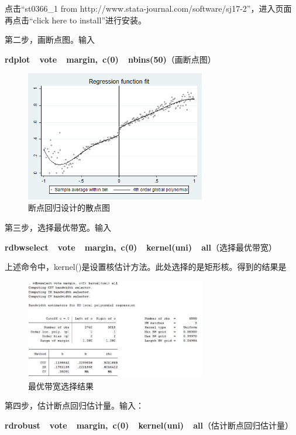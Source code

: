 \documentclass[cn,10pt,math=newtx,citestyle=gb7714-2015,bibstyle=gb7714-2015]{elegantbook}
\begin{document}
	点击“st0366\_1 from http://www.stata-journal.com/software/sj17-2”，进入页面再点击“click here to install”进行安装。
	
	第二步，画断点图。输入
	
	\textbf{rdplot~~vote~~margin,~c(0)~~nbins(50)}（画断点图）
	
	\begin{figure}[htbp]
		\centering
		\includegraphics[width=0.7\textwidth]{rdgraph.png}
		\caption{断点回归设计的散点图}\label{fig:digit}
	\end{figure}
	
	第三步，选择最优带宽。输入
	
	\textbf{rdbwselect~~vote~~margin,~c(0)~~kernel(uni)~~all}（选择最优带宽）
	
	上述命令中，kernel()是设置核估计方法。此处选择的是矩形核。得到的结果是
	
	\begin{figure}[htbp]
		\centering
		\includegraphics[width=0.7\textwidth]{rdbw.jpg}
		\caption{最优带宽选择结果}\label{fig:digit}
	\end{figure}
	
	第四步，估计断点回归估计量。输入：
	
	\textbf{rdrobust~~vote~~margin,~c(0)~~kernel(uni)~~all}（估计断点回归估计量）
	
\end{document}
